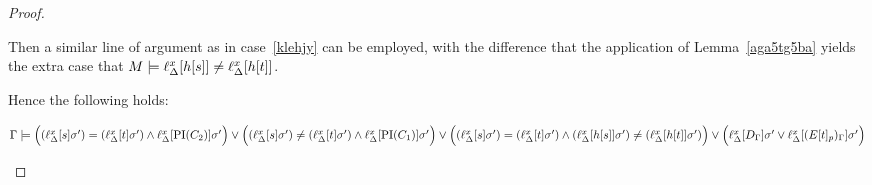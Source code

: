 \begin{proof}
\begin{description}
\begin{enumerate}
				Then a similar line of argument as in case~\ref{klehjy} can be employed, with the difference that the application of Lemma~\ref{aga5tg5ba} yields the extra case that 
			$M\models \ell_{\Delta}^{x}[h[s]] \neq \ell_{\Delta}^{x}[h[t]]$.
				\begin{comment}
				\newenvironment{lemmaCustomNo}[1]
				{\renewcommand{\thelemma}{\ref{#1}$'$}%
					\addtocounter{lemma}{-1}%
				\begin{lemma}}
				{\end{lemma}}


				Then we have to replace Lemma \ref{aga5tg5ba} by:
				\bigskip

				\begin{lemmaCustomNo}{aga5tg5ba}
					$M \entails \lifdelta{s} = \lifdelta{t}$ and $M\notentails \lifdelta{E\occurat{t}{p}}\sigma'$ imply that $M\notentails \lifdelta{E\occurat{s}{p}}\sigma'$ or that $\lifdelta{h\occurat{s}{q}} \neq \lifdelta{h\occurat{t}{q}}$.
				\end{lemmaCustomNo}
				\begin{proof}
					If $\lifdelta{E\occurat{t}{p}}$ and $\lifdelta{E\occurat{s}{p}}$ differ only at position $p$, then the proof of Lemma \ref{aga5tg5ba} applies.
					
					Otherwise position $p$ is in a maximal $\Delta$-term $h\occurat{t}{q}$, such that $h\occurat{t}{q}$ and $h\occurat{s}{q}$ are replaced with distinct variables.
					But then clearly $\lifdelta{h\occurat{s}{q}} \neq \lifdelta{h\occurat{t}{q}}$.
				\end{proof}

				\end{comment}
 Hence the following holds:

				$\Gamma \models
				\Big((\ell_{\Delta}^{x}[s]\sigma')=(\ell_{\Delta}^{x}[t]\sigma') \land \ell_{\Delta}^{x}[\operatorname{PI}(C_2)]\sigma'\Big) \lor
				\Big((\ell_{\Delta}^{x}[s]\sigma')\neq(\ell_{\Delta}^{x}[t]\sigma') \land \ell_{\Delta}^{x}[\operatorname{PI}(C_1)]\sigma'\Big) \lor
				\Big((\ell_{\Delta}^{x}[s]\sigma')=(\ell_{\Delta}^{x}[t]\sigma') \land (\ell_{\Delta}^{x}[h[s]]\sigma') \neq (\ell_{\Delta}^{x}[h[t]]\sigma' )\Big) \lor
				\Big(\ell_{\Delta}^{x}[D_\Gamma]\sigma' \lor \ell_{\Delta}^{x}[(E{[t]_{p}})_\Gamma]\sigma'\Big)$
				\qedhere
		\end{enumerate}


		\begin{comment}



			easy case:
			$\PI(C) = [ ( s=t \land \PI(C_2) ) \lor (s\neq t \land \PI(C_1)) ]\sigma$


\end{comment}
\end{description}
\end{proof}
